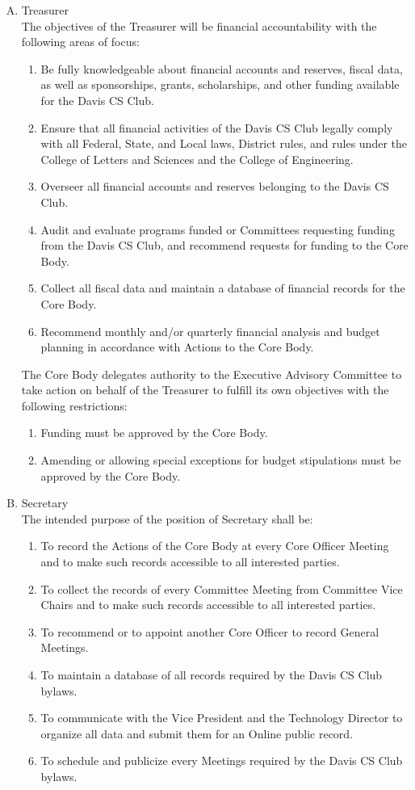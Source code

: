 \documentclass{article}
\newenvironment{li}{
\begin{enumerate}
  \setlength{\itemsep}{1pt}
  \setlength{\parskip}{0pt}
  \setlength{\parsep}{0pt}
}{\end{enumerate}}
\begin{document}
\begin{enumerate}[A.]
\begin{li}
	\end{li}
\item Treasurer\\
	The objectives of the Treasurer will be financial accountability with the following areas of focus:
	\begin{li}
	\item Be fully knowledgeable about financial accounts and reserves, fiscal data, as well as sponsorships, grants, scholarships, and other funding available for the Davis CS Club.
	\item Ensure that all financial activities of the Davis CS Club legally comply with all Federal, State, and Local laws, District rules, and rules under the College of Letters and Sciences and the College of Engineering.
	\item Overseer all financial accounts and reserves belonging to the Davis CS Club.
	\item Audit and evaluate programs funded or Committees requesting funding from the Davis CS Club, and recommend requests for funding to the Core Body.
	\item Collect all fiscal data and maintain a database of financial records for the Core Body.
	\item Recommend monthly and/or quarterly financial analysis and budget planning in accordance with Actions to the Core Body.
	\end{li}

	\noindent The Core Body delegates authority to the Executive Advisory Committee to take action on behalf of the Treasurer to fulfill its own objectives with the following restrictions:
	\begin{li}
	\item Funding must be approved by the Core Body.
	\item Amending or allowing special exceptions for budget stipulations must be approved by the Core Body.
	\end{li}
\item Secretary\\
	The intended purpose of the position of Secretary shall be:
	\begin{li}
	\item To record the Actions of the Core Body at every Core Officer Meeting and to make such records accessible to all interested parties.
	\item To collect the records of every Committee Meeting from Committee Vice Chairs and to make such records accessible to all interested parties.
	\item To recommend or to appoint another Core Officer to record General Meetings.
	\item To maintain a database of all records required by the Davis CS Club bylaws.
	\item To communicate with the Vice President and the Technology Director to organize all data and submit them for an Online public record.
	\item To schedule and publicize every Meetings required by the Davis CS Club bylaws.
	\end{li}
	

\end{enumerate}
\end{document}
